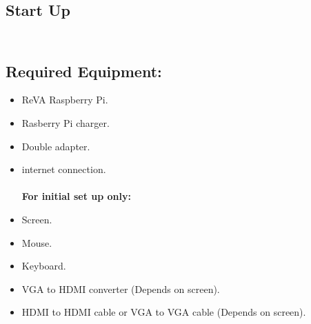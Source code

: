 \subsection{Start Up}
	\subsection*{\\Required Equipment:\\}
		\begin{itemize}
			\item ReVA Raspberry Pi.
			\item Rasberry Pi charger.
			\item Double adapter.
			\item internet connection.
			\textbf{\\\\For initial set up only: }
			\item Screen.
			\item Mouse.
			\item Keyboard.
			\item VGA to HDMI converter (Depends on screen).

			\item HDMI to HDMI cable or VGA to VGA cable (Depends on screen).

		\end{itemize}
		
